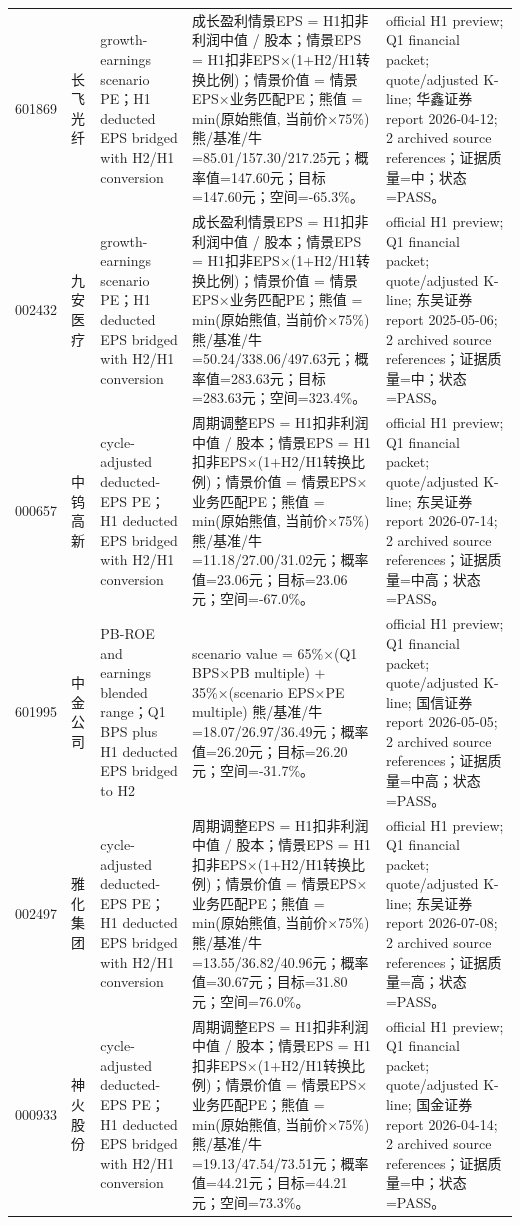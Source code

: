 \begin{longtable}{L{0.85cm}L{1.55cm}L{2.25cm}L{6.0cm}L{4.0cm}}
601869 & 长飞光纤 & growth-earnings scenario PE；H1 deducted EPS bridged with H2/H1 conversion & 成长盈利情景EPS = H1扣非利润中值 / 股本；情景EPS = H1扣非EPS×(1+H2/H1转换比例)；情景价值 = 情景EPS×业务匹配PE；熊值 = min(原始熊值, 当前价×75\%) 熊/基准/牛=85.01/157.30/217.25元；概率值=147.60元；目标=147.60元；空间=-65.3\%。 & official H1 preview; Q1 financial packet; quote/adjusted K-line; 华鑫证券 report 2026-04-12; 2 archived source references；证据质量=中；状态=PASS。 \\
002432 & 九安医疗 & growth-earnings scenario PE；H1 deducted EPS bridged with H2/H1 conversion & 成长盈利情景EPS = H1扣非利润中值 / 股本；情景EPS = H1扣非EPS×(1+H2/H1转换比例)；情景价值 = 情景EPS×业务匹配PE；熊值 = min(原始熊值, 当前价×75\%) 熊/基准/牛=50.24/338.06/497.63元；概率值=283.63元；目标=283.63元；空间=323.4\%。 & official H1 preview; Q1 financial packet; quote/adjusted K-line; 东吴证券 report 2025-05-06; 2 archived source references；证据质量=中；状态=PASS。 \\
000657 & 中钨高新 & cycle-adjusted deducted-EPS PE；H1 deducted EPS bridged with H2/H1 conversion & 周期调整EPS = H1扣非利润中值 / 股本；情景EPS = H1扣非EPS×(1+H2/H1转换比例)；情景价值 = 情景EPS×业务匹配PE；熊值 = min(原始熊值, 当前价×75\%) 熊/基准/牛=11.18/27.00/31.02元；概率值=23.06元；目标=23.06元；空间=-67.0\%。 & official H1 preview; Q1 financial packet; quote/adjusted K-line; 东吴证券 report 2026-07-14; 2 archived source references；证据质量=中高；状态=PASS。 \\
601995 & 中金公司 & PB-ROE and earnings blended range；Q1 BPS plus H1 deducted EPS bridged to H2 & scenario value = 65\%×(Q1 BPS×PB multiple) + 35\%×(scenario EPS×PE multiple) 熊/基准/牛=18.07/26.97/36.49元；概率值=26.20元；目标=26.20元；空间=-31.7\%。 & official H1 preview; Q1 financial packet; quote/adjusted K-line; 国信证券 report 2026-05-05; 2 archived source references；证据质量=中高；状态=PASS。 \\
002497 & 雅化集团 & cycle-adjusted deducted-EPS PE；H1 deducted EPS bridged with H2/H1 conversion & 周期调整EPS = H1扣非利润中值 / 股本；情景EPS = H1扣非EPS×(1+H2/H1转换比例)；情景价值 = 情景EPS×业务匹配PE；熊值 = min(原始熊值, 当前价×75\%) 熊/基准/牛=13.55/36.82/40.96元；概率值=30.67元；目标=31.80元；空间=76.0\%。 & official H1 preview; Q1 financial packet; quote/adjusted K-line; 东吴证券 report 2026-07-08; 2 archived source references；证据质量=高；状态=PASS。 \\
000933 & 神火股份 & cycle-adjusted deducted-EPS PE；H1 deducted EPS bridged with H2/H1 conversion & 周期调整EPS = H1扣非利润中值 / 股本；情景EPS = H1扣非EPS×(1+H2/H1转换比例)；情景价值 = 情景EPS×业务匹配PE；熊值 = min(原始熊值, 当前价×75\%) 熊/基准/牛=19.13/47.54/73.51元；概率值=44.21元；目标=44.21元；空间=73.3\%。 & official H1 preview; Q1 financial packet; quote/adjusted K-line; 国金证券 report 2026-04-14; 2 archived source references；证据质量=中；状态=PASS。 \\

\end{longtable}
